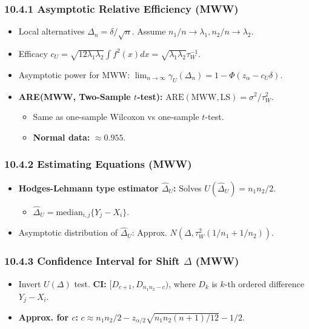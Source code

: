 \subsubsection{10.4.1 Asymptotic Relative Efficiency (MWW)}

\begin{itemize}
	\item Local alternatives $\Delta_n = \delta/\sqrt{n}$. Assume $n_1/n \to \lambda_1, n_2/n \to \lambda_2$.
	\item Efficacy $c_U = \sqrt{12\lambda_1\lambda_2} \int f^2(x)dx = \sqrt{\lambda_1\lambda_2}\tau_W^{-1}$.
	\item Asymptotic power for MWW: $\lim_{n \to \infty} \gamma_U(\Delta_n) = 1 - \Phi(z_\alpha - c_U \delta)$.
	\item \textbf{ARE(MWW, Two-Sample $t$-test):} $\text{ARE}(\text{MWW}, \text{LS}) = \sigma^2/\tau_W^2$.
	\begin{itemize}
		\item Same as one-sample Wilcoxon vs one-sample $t$-test.
		\item \textbf{Normal data:} $\approx 0.955$.
	\end{itemize}
\end{itemize}

\subsubsection{10.4.2 Estimating Equations (MWW)}

\begin{itemize}
	\item \textbf{Hodges-Lehmann type estimator $\widehat{\Delta}_U$:} Solves $U(\widehat{\Delta}_U) = n_1n_2/2$.
	\begin{itemize}
		\item $\widehat{\Delta}_U = \text{median}_{i,j}\{Y_j-X_i\}$.
	\end{itemize}
	\item Asymptotic distribution of $\widehat{\Delta}_U$: Approx. $N(\Delta, \tau_W^2(1/n_1+1/n_2))$.
\end{itemize}

\subsubsection{10.4.3 Confidence Interval for Shift \texorpdfstring{$\Delta$}{Delta} (MWW)}

\begin{itemize}
	\item Invert $U(\Delta)$ test. \textbf{CI:} $[D_{c+1}, D_{n_1n_2-c})$, where $D_k$ is $k$-th ordered difference $Y_j-X_i$.
	\item \textbf{Approx. for $c$:} $c \approx n_1n_2/2 - z_{\alpha/2}\sqrt{n_1n_2(n+1)/12} - 1/2$.
\end{itemize}

